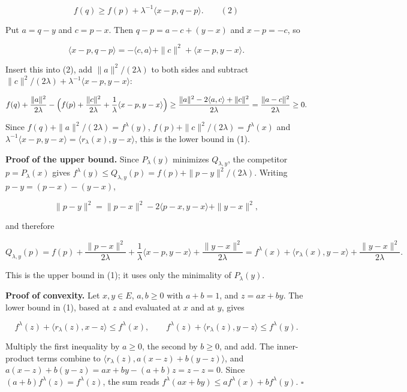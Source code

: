 \documentclass[11pt,a4paper]{report}
\begin{document}
\[f(q)\ge f(p)+\lambda^{-1}\langle x-p,q-p\rangle.\qquad(2)\]


Put \(a=q-y\) and \(c=p-x\). Then \(q-p=a-c+(y-x)\) and \(x-p=-c\), so


\[\langle x-p,q-p\rangle=-\langle c,a\rangle+\|c\|^2+\langle x-p,y-x\rangle.\]


Insert this into (2), add \(\|a\|^2/(2\lambda)\) to both sides and subtract \(\|c\|^2/(2\lambda)+\lambda^{-1}\langle x-p,y-x\rangle\):


\[f(q)+\frac{\|a\|^2}{2\lambda}-\Bigl(f(p)+\frac{\|c\|^2}{2\lambda}+\frac1\lambda\langle x-p,y-x\rangle\Bigr)\ge\frac{\|a\|^2-2\langle a,c\rangle+\|c\|^2}{2\lambda}=\frac{\|a-c\|^2}{2\lambda}\ge0.\]


Since \(f(q)+\|a\|^2/(2\lambda)=f^\lambda(y)\), \(f(p)+\|c\|^2/(2\lambda)=f^\lambda(x)\) and \(\lambda^{-1}\langle x-p,y-x\rangle=\langle r_\lambda(x),y-x\rangle\), this is the lower bound in (1).




\textbf{Proof of the upper bound.} Since \(P_\lambda(y)\) minimizes \(Q_{\lambda,y}\), the competitor \(p=P_\lambda(x)\) gives \(f^\lambda(y)\le Q_{\lambda,y}(p)=f(p)+\|p-y\|^2/(2\lambda)\). Writing \(p-y=(p-x)-(y-x)\),


\[\|p-y\|^2=\|p-x\|^2-2\langle p-x,y-x\rangle+\|y-x\|^2,\]


and therefore


\[Q_{\lambda,y}(p)=f(p)+\frac{\|p-x\|^2}{2\lambda}+\frac1\lambda\langle x-p,y-x\rangle+\frac{\|y-x\|^2}{2\lambda}=f^\lambda(x)+\langle r_\lambda(x),y-x\rangle+\frac{\|y-x\|^2}{2\lambda}.\]


This is the upper bound in (1); it uses only the minimality of \(P_\lambda(y)\).




\textbf{Proof of convexity.} Let \(x,y\in E\), \(a,b\ge0\) with \(a+b=1\), and \(z=ax+by\). The lower bound in (1), based at \(z\) and evaluated at \(x\) and at \(y\), gives


\[f^\lambda(z)+\langle r_\lambda(z),x-z\rangle\le f^\lambda(x),\qquad f^\lambda(z)+\langle r_\lambda(z),y-z\rangle\le f^\lambda(y).\]


Multiply the first inequality by \(a\ge0\), the second by \(b\ge0\), and add. The inner-product terms combine to \(\langle r_\lambda(z),a(x-z)+b(y-z)\rangle\), and \(a(x-z)+b(y-z)=ax+by-(a+b)z=z-z=0\). Since \((a+b)f^\lambda(z)=f^\lambda(z)\), the sum reads \(f^\lambda(ax+by)\le af^\lambda(x)+bf^\lambda(y)\). \(\square\)
\end{document}
